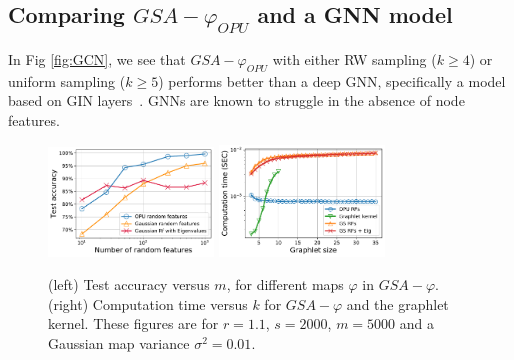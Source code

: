 \documentclass{article}
\begin{document}

\subsection{Comparing $GSA-\varphi_{OPU}$ and a GNN model}\label{sec:vs_GIN}

In Fig \ref{fig:GCN}, we see that $GSA-\varphi_{OPU}$ with either RW sampling  ($k\geq4$) or uniform sampling ($k\geq5$) performs better than a deep GNN, specifically a model based on GIN layers~\cite{GCN_powerful}. GNNs are known to struggle in the absence of node features. %



\begin{figure}
\centering
		\includegraphics[width=4.4cm]{figs/phi_comparison.pdf}%
		\includegraphics[width=4.4cm]{figs/computational_comp.pdf}%
	\caption{ (left) Test accuracy versus $m$, for different maps  $\varphi$ in $GSA-\varphi$. (right) Computation time versus $k$ for $GSA-\varphi$ and the graphlet kernel. These figures are for $r=1.1$, $s=2000$, $m=5000$ and a Gaussian map variance $\sigma^2=0.01$.}
	\label{fig:diff_phi}
\end{figure}
\end{document}
